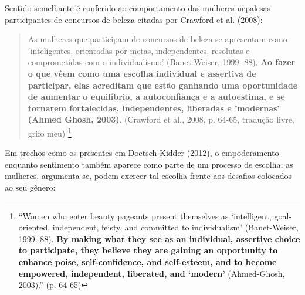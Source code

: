 Sentido semelhante é conferido ao comportamento das mulheres nepalesas participantes de concursos de beleza citadas por Crawford et al. (2008):

\begin{quote}
    As mulheres que participam de concursos de beleza se apresentam como ‘inteligentes, orientadas por metas, independentes, resolutas e comprometidas com o individualismo’ (Banet-Weiser, 1999: 88). \textbf{Ao fazer o que vêem como uma escolha individual e assertiva de participar, elas acreditam que estão ganhando uma oportunidade de aumentar o equilíbrio, a autoconfiança e a autoestima, e se tornarem fortalecidas, independentes, liberadas e 'modernas' (Ahmed Ghosh, 2003)}. (Crawford et al., 2008, p. 64-65, tradução livre, grifo meu) \footnote{``Women who enter beauty pageants present themselves as ‘intelligent, goal-oriented, independent, feisty, and committed to individualism’ (Banet-Weiser, 1999: 88). \textbf{By making what they see as an individual, assertive choice to participate, they believe they are gaining an opportunity to enhance poise, self-confidence, and self-esteem, and to become empowered, independent, liberated, and ‘modern’} (Ahmed-Ghosh, 2003).'' (p. 64-65)}
\end{quote}

Em trechos como os presentes em Doetsch-Kidder (2012), o empoderamento enquanto sentimento também aparece como parte de um processo de escolha; as mulheres, argumenta-se, podem exercer tal escolha frente aos desafios colocados ao seu gênero:

